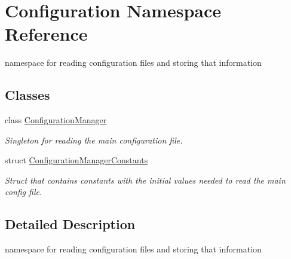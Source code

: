 \hypertarget{namespace_configuration}{}\section{Configuration Namespace Reference}
\label{namespace_configuration}


namespace for reading configuration files and storing that information  


\subsection*{Classes}
\begin{DoxyCompactItemize}
\item 
class \mbox{\hyperlink{class_configuration_1_1_configuration_manager}{Configuration\+Manager}}
\begin{DoxyCompactList}\small\item\em Singleton for reading the main configuration file. \end{DoxyCompactList}\item 
struct \mbox{\hyperlink{struct_configuration_1_1_configuration_manager_constants}{Configuration\+Manager\+Constants}}
\begin{DoxyCompactList}\small\item\em Struct that contains constants with the initial values needed to read the main config file. \end{DoxyCompactList}\end{DoxyCompactItemize}


\subsection{Detailed Description}
namespace for reading configuration files and storing that information 
